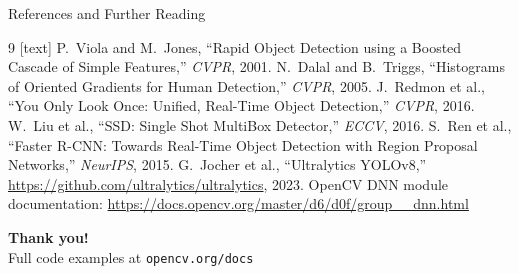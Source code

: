 \documentclass[aspectratio=169]{beamer}
\begin{document}
\begin{frame}{References and Further Reading}
  \begin{thebibliography}{9}
    [text]
      P.~Viola and M.~Jones, ``Rapid Object Detection using a Boosted Cascade of Simple Features,''
      \emph{CVPR}, 2001.
      N.~Dalal and B.~Triggs, ``Histograms of Oriented Gradients for Human Detection,''
      \emph{CVPR}, 2005.
      J.~Redmon et al., ``You Only Look Once: Unified, Real-Time Object Detection,''
      \emph{CVPR}, 2016.
      W.~Liu et al., ``SSD: Single Shot MultiBox Detector,''
      \emph{ECCV}, 2016.
      S.~Ren et al., ``Faster R-CNN: Towards Real-Time Object Detection with Region Proposal Networks,''
      \emph{NeurIPS}, 2015.
      G.~Jocher et al., ``Ultralytics YOLOv8,'' \url{https://github.com/ultralytics/ultralytics}, 2023.
      OpenCV DNN module documentation: \url{https://docs.opencv.org/master/d6/d0f/group__dnn.html}
  \end{thebibliography}
  \vspace{6pt}
  \begin{center}
    \large\textbf{Thank you!} \\[4pt]
    \small Full code examples at \texttt{opencv.org/docs}
  \end{center}
\end{frame}
\end{document}
